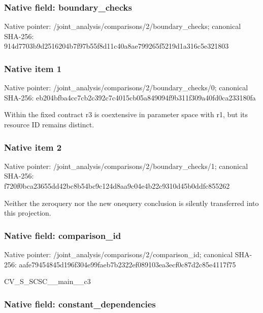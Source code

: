 \documentclass[10pt,a4paper]{article}
\begin{document}
\subsubsection{Native field: boundary\_checks}


Native pointer: /joint\_analysis/comparis\allowbreak{}ons/2/boundary\_checks; canonical SHA-256: 914d7703b9d2516204b7f97b\allowbreak{}55f8d11c40a8ae799265f521\allowbreak{}9d1a316c5e321803



\subsubsection{Native item 1}


Native pointer: /joint\_analysis/comparis\allowbreak{}ons/2/boundary\_checks/0; canonical SHA-256: eb204bfba4cc7cb2c392c7c4\allowbreak{}015cb05a849094f9b311f309\allowbreak{}a40fd0ca233180fa


Within the fixed contract r3 is coextensive in parameter space with r1, but its resource ID remains distinct.


\subsubsection{Native item 2}


Native pointer: /joint\_analysis/comparis\allowbreak{}ons/2/boundary\_checks/1; canonical SHA-256: f720f0bca23655dd42bc8b54\allowbreak{}bc9c124d8aa9c04e4b22c931\allowbreak{}0d45b0ddfc855262


Neither the zeroquery nor the new onequery conclusion is silently transferred into this projection.


\subsubsection{Native field: comparison\_id}


Native pointer: /joint\_analysis/comparis\allowbreak{}ons/2/comparison\_id; canonical SHA-256: aafe79454845d196f304e99f\allowbreak{}aeb7b2322ef089103ea3ecf0\allowbreak{}c87d2c85e4117f75


CV\_S\_SCSC\_\_main\_\_c3


\subsubsection{Native field: constant\_dependencies}
\end{document}
